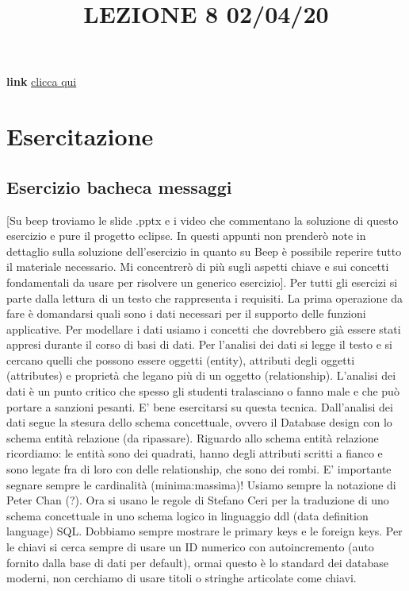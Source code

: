 \title{LEZIONE 8 02/04/20}\newline
\textbf{link} \href{https://web.microsoftstream.com/video/75f95083-fbf8-4126-8c4d-c65d89f7c6b3}{clicca qui}
\section{Esercitazione}
\subsection{Esercizio bacheca messaggi}
[Su beep troviamo le slide .pptx e i video che commentano la soluzione di questo esercizio e pure il progetto eclipse. In questi appunti non prenderò note in dettaglio sulla soluzione dell'esercizio in quanto su Beep è possibile reperire tutto il materiale necessario. Mi concentrerò di più sugli aspetti chiave e sui concetti fondamentali da usare per risolvere un generico esercizio].\newline
\newline
Per tutti gli esercizi si parte dalla lettura di un testo che rappresenta i requisiti.\newline
\newline
La prima operazione da fare è domandarsi quali sono i dati necessari per il supporto delle funzioni applicative. Per modellare i dati usiamo i concetti che dovrebbero già essere stati appresi durante il corso di basi di dati.\newline
Per l'analisi dei dati si legge il testo e si cercano quelli che possono essere oggetti (entity), attributi degli oggetti (attributes) e proprietà che legano più di un oggetto (relationship).\newline
L'analisi dei dati è un punto critico che spesso gli studenti tralasciano o fanno male e che può portare a sanzioni pesanti. E' bene esercitarsi su questa tecnica.\newline
\newline
Dall'analisi dei dati segue la stesura dello schema concettuale, ovvero il Database design con lo schema entità relazione (da ripassare). Riguardo allo schema entità relazione ricordiamo: le entità sono dei quadrati, hanno degli attributi scritti a fianco e sono legate fra di loro con delle relationship, che sono dei rombi. E' importante segnare sempre le cardinalità (minima:massima)! Usiamo sempre la notazione di Peter Chan (?).\newline
\newline
Ora si usano le regole di Stefano Ceri per la traduzione di uno schema concettuale in uno schema logico in linguaggio ddl (data definition language) SQL. Dobbiamo sempre mostrare le primary keys e le foreign keys. Per le chiavi si cerca sempre di usare un ID numerico con autoincremento (auto fornito dalla base di dati per default), ormai questo è lo standard dei database moderni, non cerchiamo di usare titoli o stringhe articolate come chiavi.\newline

